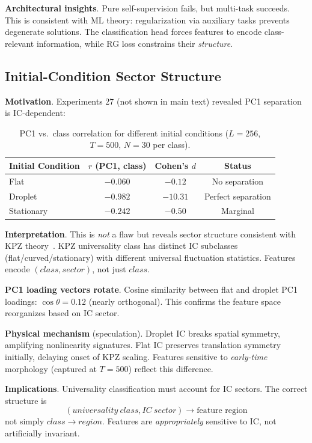 \documentclass[aps,pre,reprint,amsmath,amssymb,superscriptaddress]{revtex4-2}
\begin{document}
\textbf{Architectural insights}. Pure self-supervision fails, but multi-task succeeds. This is consistent with ML theory: regularization via auxiliary tasks prevents degenerate solutions. The classification head forces features to encode class-relevant information, while RG loss constrains their \textit{structure}.

\subsection{Initial-Condition Sector Structure}

\textbf{Motivation}. Experiments 27 (not shown in main text) revealed PC1 separation is IC-dependent:

\begin{table}[h]
\centering
\caption{PC1 vs.~class correlation for different initial conditions ($L=256$, $T=500$, $N=30$ per class).}
\begin{tabular}{lccc}
\toprule
Initial Condition & $r$ (PC1, class) & Cohen's $d$ & Status \\
\midrule
Flat & $-0.060$ & $-0.12$ & No separation \\
Droplet & $-0.982$ & $-10.31$ & Perfect separation \\
Stationary & $-0.242$ & $-0.50$ & Marginal \\
\bottomrule
\end{tabular}
\label{tab:ic-dependence}
\end{table}

\textbf{Interpretation}. This is \textit{not} a flaw but reveals sector structure consistent with KPZ theory~\cite{Ferrari2011}. KPZ universality class has distinct IC subclasses (flat/curved/stationary) with different universal fluctuation statistics. Features encode $(class, sector)$, not just $class$.

\textbf{PC1 loading vectors rotate}. Cosine similarity between flat and droplet PC1 loadings: $\cos \theta = 0.12$ (nearly orthogonal). This confirms the feature space reorganizes based on IC sector.

\textbf{Physical mechanism} (speculation). Droplet IC breaks spatial symmetry, amplifying nonlinearity signatures. Flat IC preserves translation symmetry initially, delaying onset of KPZ scaling. Features sensitive to \textit{early-time} morphology (captured at $T=500$) reflect this difference.

\textbf{Implications}. Universality classification must account for IC sectors. The correct structure is
\begin{equation}
(universality\ class, IC\ sector) \to \text{feature region}
\end{equation}
not simply $class \to region$. Features are \textit{appropriately} sensitive to IC, not artificially invariant.
\end{document}
